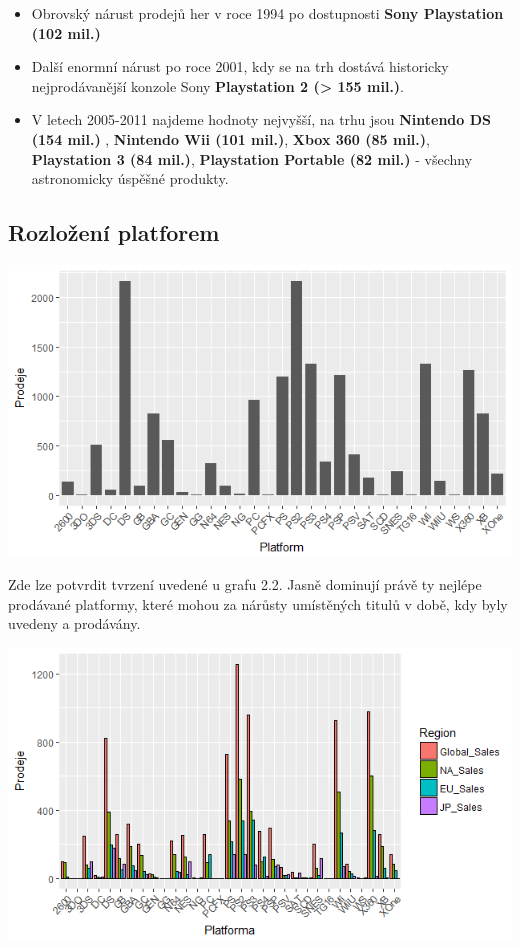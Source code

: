\documentclass[a4paper,11pt]{article}
\begin{document}
\begin{itemize}
\item Obrovský nárust prodejů her v roce 1994 po dostupnosti \textbf{Sony Playstation (102 mil.)}

\item Další enormní nárust po roce 2001, kdy se na trh dostává historicky nejprodávanější konzole Sony \textbf{Playstation 2 (> 155 mil.)}.

\item V letech 2005-2011 najdeme hodnoty nejvyšší, na trhu jsou \textbf{Nintendo DS (154 mil.)} , \textbf{Nintendo Wii (101 mil.)}, \textbf{Xbox 360 (85 mil.)}, \textbf{Playstation 3 (84 mil.)}, \textbf{Playstation Portable (82 mil.)}  - všechny astronomicky úspěšné produkty.
\end{itemize}


\newpage

\subsection{Rozložení platforem}

\includegraphics[scale=0.75]{Rplot03}

Zde lze potvrdit tvrzení uvedené u grafu 2.2. Jasně dominují právě ty nejlépe prodávané platformy, které mohou za nárůsty umístěných titulů v době, kdy byly uvedeny a prodávány. 



\includegraphics[scale=0.9]{Rplot02}
\end{document}
